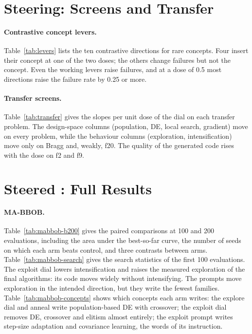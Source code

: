 

\section{Steering: Screens and Transfer}\label{app:steering}

\paragraph{Contrastive concept levers.}
Table~\ref{tab:levers} lists the ten contrastive directions for rare
concepts. Four insert their concept at one of the two doses; the others
change failures but not the concept. Even the working levers raise
failures, and at a dose of 0.5 most directions raise the failure rate
by 0.25 or more.



\paragraph{Transfer screens.}
Table~\ref{tab:transfer} gives the slopes per unit dose of the dial on
each transfer problem. The design-space columns (population, DE, local
search, gradient) move on every problem, while the behaviour columns
(exploration, intensification) move only on Bragg and, weakly, f20.
The quality of the generated code rises with the dose on f2 and f9.



\section{Steered \llamea: Full Results}\label{app:loop}

\paragraph{MA-BBOB\@.}
Table~\ref{tab:mabbob-b200} gives the paired comparisons at 100 and 200
evaluations, including the area under the best-so-far curve, the number
of seeds on which each arm beats control, and three contrasts between
arms. Table~\ref{tab:mabbob-search} gives the search statistics of the
first 100 evaluations. The exploit dial lowers intensification and
raises the measured exploration of the final algorithms: its code moves
widely without intensifying. The
prompts move exploration in the intended direction, but they write the
fewest families. Table~\ref{tab:mabbob-concepts} shows which concepts
each arm writes: the explore dial and anneal write population-based DE
with crossover; the exploit dial removes DE, crossover and elitism
almost entirely; the exploit prompt writes step-size adaptation and
covariance learning, the words of its instruction.

